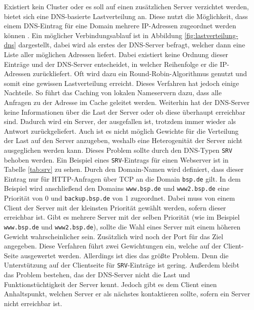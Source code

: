 \documentclass[a4paper, 12pt, BCOR10mm, DIV12, toc=bibliography, toc=listof, german]{scrbook}
\begin{document}
			Existiert kein Cluster oder es soll auf einen zusätzlichen Server verzichtet werden, bietet
			sich eine DNS-basierte Lastverteilung an. Diese nutzt die Möglichkeit, dass einem DNS-Eintrag
			für eine Domain mehrere IP-Adressen zugeordnet werden können \cite{rfc1034}. Ein möglicher
			Verbindungsablauf ist in Abbildung \ref{fig:lastverteilung-dns} dargestellt, dabei wird als
			erstes der DNS-Server befragt, welcher dann eine Liste aller möglichen Adressen liefert. Dabei
			existiert keine Ordnung dieser Einträge und der DNS-Server entscheidet, in welcher Reihenfolge
			er die IP-Adressen zurückliefert. Oft wird dazu ein Round-Robin-Algorithmus genutzt und somit
			eine gewissen Lastverteilung erreicht. Dieses Verfahren hat jedoch einige Nachteile. So führt
			das Caching von lokalen Nameservern dazu, dass alle Anfragen zu der Adresse im Cache geleitet
			werden. Weiterhin hat der DNS-Server keine Informationen über die Last der Server oder ob
			diese überhaupt erreichbar sind. Dadurch wird ein Server, der ausgefallen ist, trotzdem immer
			wieder als Antwort zurückgeliefert. Auch ist es nicht möglich Gewichte für die Verteilung der
			Last auf den Server anzugeben, weshalb eine Heterogenität der Server nicht ausgeglichen werden
			kann. Dieses Problem sollte durch den DNS-Typen \texttt{SRV} \cite{rfc2782} behoben werden.
			Ein Beispiel eines \texttt{SRV}-Eintrags für einen Webserver ist in Tabelle \ref{tab:srv} zu
			sehen. Durch den Domain-Namen wird definiert, dass dieser Eintrag nur für HTTP-Anfragen über
			TCP an die Domain \texttt{bsp.de} gilt. In dem Beispiel wird anschließend den Domains
			\texttt{www.bsp.de} und \texttt{www2.bsp.de} eine Priorität von 0 und \texttt{backup.bsp.de}
			von 1 zugeordnet. Dabei muss von einem Client der Server mit der kleinsten Priorität gewählt
			werden, sofern dieser erreichbar ist. Gibt es mehrere Server mit der selben Priorität (wie im
			Beispiel \texttt{www.bsp.de} und \texttt{www2.bsp.de}), sollte die Wahl eines Server mit einem
			höheren Gewicht wahrscheinlicher sein. Zusätzlich wird noch der Port für das Ziel angegeben.
			Diese Verfahren führt zwei Gewichtungen ein, welche auf der Client-Seite ausgewertet werden.
			Allerdings ist dies das größte Problem. Denn die Unterstützung auf der Clientseite für
			\texttt{SRV}-Einträge ist gering. Außerdem bleibt das Problem bestehen, das der DNS-Server
			nicht die Last und Funktionstüchtigkeit der Server kennt.  Jedoch gibt es dem Client einen
			Anhaltspunkt, welchen Server er als nächstes kontaktieren sollte, sofern ein Server nicht
			erreichbar ist.
\end{document}
